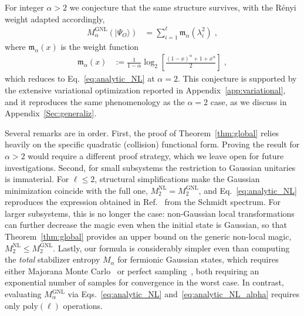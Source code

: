 \documentclass[prx,twocolumn,superscriptaddress,aps,10pt, frontmatterverbose, reprint,footinbib,longbibliography=true]{revtex4-2}
\newcommand{\RENYI}{\alpha}
\begin{document}
For integer $\RENYI>2$ we conjecture that the same structure survives, with the R\'enyi weight adapted accordingly,
    \begin{equation} 
    \begin{split}
      M_{\RENYI}^{\mathrm{GNL}}(|\Psi_O\rangle)\! &= \sum_{i=1}^{\ell}\mathfrak{m}_\RENYI(\lambda_i^2)\;,
    \end{split}
    \label{eq:analytic_NL_alpha}
    \end{equation}
\noindent
where $\mathfrak{m}_\RENYI(x)$ is the weight function
\begin{equation}
    \begin{split}
      \mathfrak{m}_\RENYI(x)&:=
    \frac{1}{1-\RENYI}\log_2\! \left[\frac{\left(1-x \right)^{\RENYI }\!\!+1+ x^{ \RENYI }}{2} \right]\;, 
    \end{split}
    \label{eq:analytic_NL_weights}
    \end{equation}
which reduces to Eq.~\eqref{eq:analytic_NL} at $\RENYI=2$. This conjecture is supported by the extensive variational optimization reported in Appendix~\ref{app:variational}, and it reproduces the same phenomenology as the $\RENYI=2$ case, as we discuss in Appendix~\ref{Sec:generaliz}.

Several remarks are in order.
First, the proof of Theorem~\ref{thm:global} relies heavily on the specific quadratic (collision) functional form. Proving the result for $\RENYI>2$ would require a different proof strategy, which we leave open for future investigations.
Second, for small subsystems the restriction to Gaussian unitaries is immaterial. For $\ell\le 2$, structural simplifications make the Gaussian minimization coincide with the full one, $M_2^{\mathrm{NL}}=M_2^{\mathrm{GNL}}$, and Eq.~\eqref{eq:analytic_NL} reproduces the expression obtained in Ref.~\cite{Cao_2025} from the Schmidt spectrum. For larger subsystems, this is no longer the case: non-Gaussian local transformations can further decrease the magic even when the initial state is Gaussian, so that Theorem~\ref{thm:global} provides an upper bound on the generic non-local magic, $M_2^{\mathrm{NL}}\le M_2^{\mathrm{GNL}}$.
Lastly, our formula is considerably simpler even than computing the \emph{total} stabilizer entropy $M_\RENYI$ for fermionic Gaussian states, which requires either Majorana Monte Carlo~\cite{Bera_2025} or perfect sampling~\cite{collura2026nonstabilizernessfermionicgaussianstates}, both requiring an exponential number of samples for convergence in the worst case. In contrast, evaluating $M_\RENYI^\mathrm{GNL}$ via Eqs.~\eqref{eq:analytic_NL} and~\eqref{eq:analytic_NL_alpha} requires only $\mathrm{poly}(\ell)$ operations.
\end{document}
